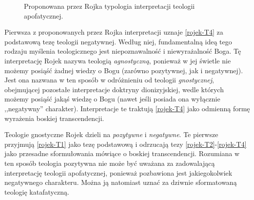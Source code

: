 \begin{figure}[H]
\begin{center}

\caption[Typologia teologii według Rojka]{Proponowana przez Rojka
typologia interpretacji teologii apofatycznej\footnotemark.}\label{roj-typ-rys}
\end{center}
\end{figure}




Pierwsza z proponowanych przez Rojka interpretacji uznaje \eqref{rojek-T4} za
podstawową tezę teologii negatywnej. Według niej, fundamentalną ideą tego
rodzaju myślenia teologicznego jest niepoznawalność i niewyrażalność
Boga. Tę interpretację Rojek nazywa teologią \textit{agnostyczną},
ponieważ w jej świetle nie możemy posiąść żadnej wiedzy o Bogu
(zarówno pozytywnej, jak i negatywnej). Jest ona nazwana w ten sposób w
odróżnieniu od teologii \textit{gnostycznej}, obejmującej pozostałe
interpretacje doktryny dionizyjskiej, wedle których możemy posiąść
jakąś wiedzę o Bogu (nawet jeśli posiada ona wyłącznie ,,negatywny''
charakter). Interpretacje te traktują \eqref{rojek-T4} jako odmienną formę wyrażenia
boskiej transcendencji.

Teologie gnostyczne Rojek dzieli na \textit{pozytywne} i
\textit{negatywne}. Te pierwsze przyjmują \eqref{rojek-T1} jako tezę podstawową i
odrzucają tezy \eqref{rojek-T2}-\eqref{rojek-T4} jako przesadne sformułowania mówiące o
boskiej transcendencji. Rozumiana w ten sposób teologia pozytywna nie
może być uważana za zadowalającą interpretację teologii apofatycznej,
ponieważ pozbawiona jest jakiegokolwiek negatywnego charakteru.
Można ją natomiast uznać za dziwnie sformatowaną teologię
katafatyczną.




